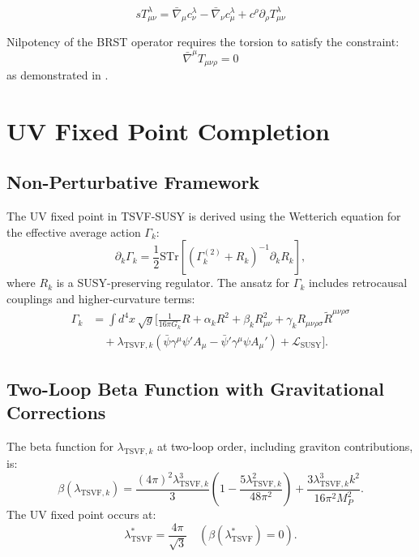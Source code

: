 \documentclass[twocolumn,superscriptaddress,floatfix]{revtex4-2}
\begin{document}
\begin{equation}
sT^\lambda_{\mu\nu} = \bar\nabla_\mu c^\lambda_\nu - \bar\nabla_\nu c^\lambda_\mu + c^\rho\partial_\rho T^\lambda_{\mu\nu}
\label{eq:brst_torsion}
\end{equation}

\noindent Nilpotency of the BRST operator requires the torsion to satisfy the constraint:
\[
\bar\nabla^\mu T_{\mu\nu\rho} = 0
\]
as demonstrated in \cite{Henneaux:1992}. 

\section{UV Fixed Point Completion}
\label{sec:uv_fixed}

\subsection{Non-Perturbative Framework}
The UV fixed point in TSVF-SUSY is derived using the Wetterich equation for the effective average action \(\Gamma_k\):
\begin{equation}
    \partial_k \Gamma_k = \frac{1}{2} \text{STr} \left[ \left( \Gamma_k^{(2)} + R_k \right)^{-1} \partial_k R_k \right],
    \label{eq:wetterich_main}
\end{equation}
where \(R_k\) is a SUSY-preserving regulator. The ansatz for \(\Gamma_k\) includes retrocausal couplings and higher-curvature terms:
\begin{align}
    \Gamma_k &= \int d^4x \, \sqrt{g} \bigg[ \frac{1}{16\pi G_k} R + \alpha_k R^2 + \beta_k R_{\mu\nu}^2 + \gamma_k R_{\mu\nu\rho\sigma} \tilde{R}^{\mu\nu\rho\sigma} \nonumber \\
    &\quad + \lambda_{\text{TSVF},k} \left( \bar{\psi}\gamma^\mu \psi' A_\mu - \bar{\psi}'\gamma^\mu \psi A_\mu' \right) + \mathcal{L}_{\text{SUSY}} \bigg].
    \label{eq:effective_action}
\end{align}

\subsection{Two-Loop Beta Function with Gravitational Corrections}
The beta function for \(\lambda_{\text{TSVF},k}\) at two-loop order, including graviton contributions, is:
\begin{equation}
    \beta(\lambda_{\text{TSVF},k}) = \frac{(4\pi)^2 \lambda_{\text{TSVF},k}^3}{3} \left( 1 - \frac{5\lambda_{\text{TSVF},k}^2}{48\pi^2} \right) + \frac{3\lambda_{\text{TSVF},k}^3 k^2}{16\pi^2 M_P^2}.
    \label{eq:beta_full}
\end{equation}
The UV fixed point occurs at:
\begin{equation}
    \lambda_{\text{TSVF}}^* = \frac{4\pi}{\sqrt{3}} \quad (\beta(\lambda_{\text{TSVF}}^*) = 0).
    \label{eq:uv_fixed}
\end{equation}
\end{document}
